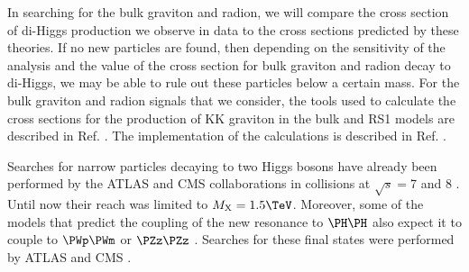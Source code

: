 In searching for the bulk graviton and radion, we will compare the cross section of di-Higgs production we observe in data to the cross sections predicted by these theories. If no new particles are found, then depending on the sensitivity of the analysis and the value of the cross section for bulk graviton and radion decay to di-Higgs, we may be able to rule out these particles below a certain mass. For the bulk graviton and radion signals that we consider, the tools used to calculate the cross sections for the production of KK graviton in the bulk and RS1 models are described in Ref. \cite{Agashe:2013kyb, deAquino:2011ix}. The implementation of the calculations is described in Ref. \cite{Oliveira:2014kla}.   


Searches for narrow particles decaying to two Higgs bosons have already been performed by the ATLAS \cite{Aad:2014yja, Aad:2015uka, Aad:2015xja} and CMS \cite{Khachatryan:2014jya,Khachatryan:2015year,Khachatryan:2015tha} collaborations in \Pp\Pp collisions at $\sqrt{s} = $7 and 8 \TeV. Until now their reach was limited to $\mx = 1.5\TeV$. Moreover, some of the models that predict the coupling of the new resonance to $\HH$ also expect it to couple to $\PWp\PWm$ or $\PZz\PZz$ \cite{Brehmer:2015dan}. Searches for these final states were performed by ATLAS and CMS \cite{ATLASVV, ATLASWV, ATLASZV, Khachatryan:2014hpa, CMSZVWV}. 



